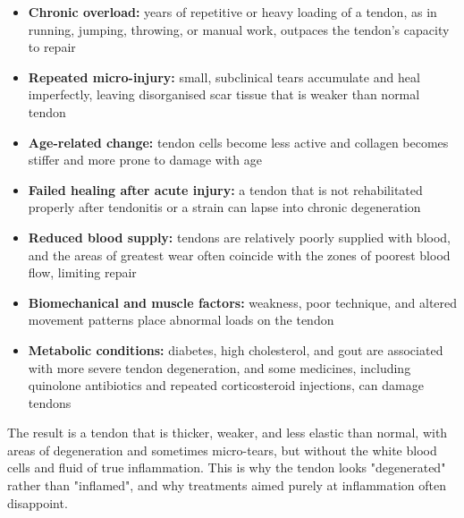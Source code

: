 \begin{itemize}
    \item \textbf{Chronic overload:} years of repetitive or heavy loading of a tendon, as in running, jumping, throwing, or manual work, outpaces the tendon's capacity to repair
    \item \textbf{Repeated micro-injury:} small, subclinical tears accumulate and heal imperfectly, leaving disorganised scar tissue that is weaker than normal tendon
    \item \textbf{Age-related change:} tendon cells become less active and collagen becomes stiffer and more prone to damage with age
    \item \textbf{Failed healing after acute injury:} a tendon that is not rehabilitated properly after tendonitis or a strain can lapse into chronic degeneration
    \item \textbf{Reduced blood supply:} tendons are relatively poorly supplied with blood, and the areas of greatest wear often coincide with the zones of poorest blood flow, limiting repair
    \item \textbf{Biomechanical and muscle factors:} weakness, poor technique, and altered movement patterns place abnormal loads on the tendon
    \item \textbf{Metabolic conditions:} diabetes, high cholesterol, and gout are associated with more severe tendon degeneration, and some medicines, including quinolone antibiotics and repeated corticosteroid injections, can damage tendons
\end{itemize}

The result is a tendon that is thicker, weaker, and less elastic than normal, with areas of degeneration and sometimes micro-tears, but without the white blood cells and fluid of true inflammation. This is why the tendon looks "degenerated" rather than "inflamed", and why treatments aimed purely at inflammation often disappoint.

